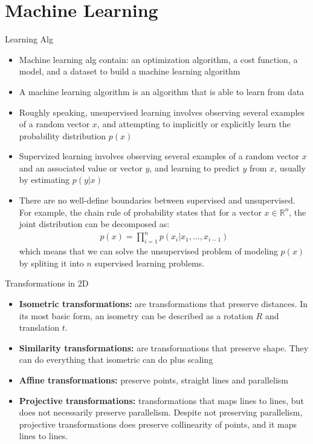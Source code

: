 \documentclass[10pt,mathserif]{beamer}
\begin{document}
\section{Machine Learning}
\begin{frame}{Learning Alg}
\begin{itemize}
\item Machine learning alg contain: an optimization algorithm, a cost function, a model, and a dataset to
build a machine learning algorithm
\item A machine learning algorithm is an algorithm that is able to learn from data
\item Roughly speaking, unsupervised learning involves observing several examples of a random vector $x$, and
attempting to implicitly or explicitly learn the probability distribution $p(x)$ 
\item Supervized learning involves observing several examples of a random vector $x$ and an associated value
or vector $y$, and learning to predict $y$ from $x$, usually by estimating $p(y|x)$
\item There are no well-define boundaries between supervised and unsupervised. For example, the chain rule of
probability states that for a vector $x\in \mathbb{R}^n$, the joint distribution can be decomposed as:
\begin{align}
p(x) = \prod_{i=1}^n p(x_i|x_1,\dots,x_{i-1})
\end{align}
which means that we can solve the unsupervised problem of modeling $p(x)$ by spliting it into $n$ supervised
learning problems.
\end{itemize}
\end{frame}


\begin{frame}{Transformations in 2D}
\begin{itemize}
\item \textbf{Isometric transformations:} are transformations that preserve distances. In its most basic
form, an isometry can be described as a rotation $R$ and translation $t$.
\item \textbf{Similarity transformations:} are transformations that preserve shape. They can do everything that 
isometric can do plus scaling
\item \textbf{Affine transformations:} preserve points, straight lines and parallelism
\item \textbf{Projective transformations:} transformations that maps lines to lines, but does not necessarily preserve parallelism. Despite not preserving parallelism, projective transformations does preserve collinearity of points, and it maps lines to lines.
\end{itemize}
\end{frame}
\end{document}
